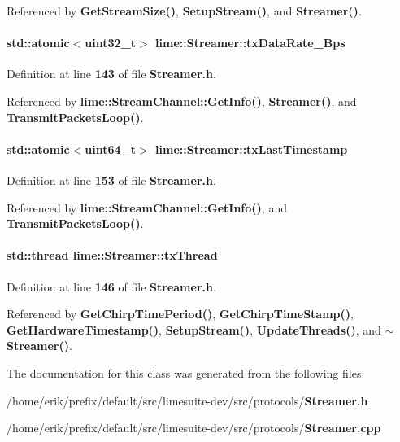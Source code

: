 Referenced by {\bf Get\+Stream\+Size()}, {\bf Setup\+Stream()}, and {\bf Streamer()}.

\paragraph[{tx\+Data\+Rate\+\_\+\+Bps}]{\setlength{\rightskip}{0pt plus 5cm}std\+::atomic$<$uint32\+\_\+t$>$ lime\+::\+Streamer\+::tx\+Data\+Rate\+\_\+\+Bps}\label{classlime_1_1Streamer_af0888ee52ab1dd461c8dd15f5d20182c}


Definition at line {\bf 143} of file {\bf Streamer.\+h}.



Referenced by {\bf lime\+::\+Stream\+Channel\+::\+Get\+Info()}, {\bf Streamer()}, and {\bf Transmit\+Packets\+Loop()}.

\paragraph[{tx\+Last\+Timestamp}]{\setlength{\rightskip}{0pt plus 5cm}std\+::atomic$<$uint64\+\_\+t$>$ lime\+::\+Streamer\+::tx\+Last\+Timestamp}\label{classlime_1_1Streamer_ad6489237eecb85f84c4fdc9a4619a648}


Definition at line {\bf 153} of file {\bf Streamer.\+h}.



Referenced by {\bf lime\+::\+Stream\+Channel\+::\+Get\+Info()}, and {\bf Transmit\+Packets\+Loop()}.

\paragraph[{tx\+Thread}]{\setlength{\rightskip}{0pt plus 5cm}std\+::thread lime\+::\+Streamer\+::tx\+Thread}\label{classlime_1_1Streamer_aa90caa658ae054c9dd389f6b09bad00a}


Definition at line {\bf 146} of file {\bf Streamer.\+h}.



Referenced by {\bf Get\+Chirp\+Time\+Period()}, {\bf Get\+Chirp\+Time\+Stamp()}, {\bf Get\+Hardware\+Timestamp()}, {\bf Setup\+Stream()}, {\bf Update\+Threads()}, and {\bf $\sim$\+Streamer()}.



The documentation for this class was generated from the following files\+:\begin{DoxyCompactItemize}
\item 
/home/erik/prefix/default/src/limesuite-\/dev/src/protocols/{\bf Streamer.\+h}\item 
/home/erik/prefix/default/src/limesuite-\/dev/src/protocols/{\bf Streamer.\+cpp}\end{DoxyCompactItemize}
